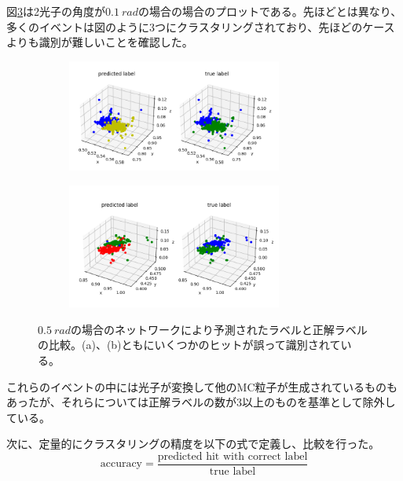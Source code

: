 図\ref{DoublePG_1_res}は2光子の角度が$\SI{0.1}{rad}$の場合の場合のプロットである。先ほどとは異なり、多くのイベントは図のように3つにクラスタリングされており、先ほどのケースよりも識別が難しいことを確認した。
\begin{figure}[H]
	\begin{subfigure}{.5\textwidth}
		\begin{center}
 		 	\includegraphics[width=200pt]{./Figure/DLAnalysis/Double1_2.png}%
  			\caption{}
  			\label{DPG_res_a}
 		\end{center}
	\end{subfigure}
	\begin{subfigure}{.5\textwidth}
		\begin{center}
			\includegraphics[width=200pt]{./Figure/DLAnalysis/Double1_1.png}%
			\caption{}
			\label{DPG_res_b}
		\end{center}
	\end{subfigure}
	\caption[$\SI{0.5}{rad}$の場合の場合の比較]{$\SI{0.5}{rad}$の場合のネットワークにより予測されたラベルと正解ラベルの比較。(a)、(b)ともにいくつかのヒットが誤って識別されている。}
	\label{DoublePG_1_res}
\end{figure}

これらのイベントの中には光子が変換して他のMC粒子が生成されているものもあったが、それらについては正解ラベルの数が3以上のものを基準として除外している。

次に、定量的にクラスタリングの精度を以下の式で定義し、比較を行った。
\begin{equation}
\textrm{accuracy} = \frac{\textrm{predicted\ hit\ with\ correct\ label}}{\textrm{true\ label}}
\end{equation}

